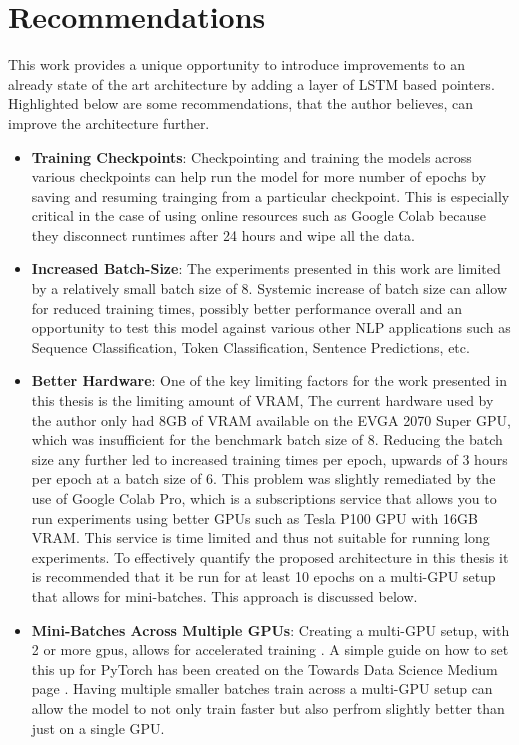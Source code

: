 \documentclass[a4paper,12pt]{report}
\begin{document}
    \section{Recommendations}
    
    This work provides a unique opportunity to introduce improvements to an already state of the art architecture by adding a layer of LSTM based pointers. Highlighted below are some recommendations, that the author believes, can improve the architecture further.
    
    \begin{itemize}
    	
    	\item \textbf{Training Checkpoints}: Checkpointing and training the models across various checkpoints can help run the model for more number of epochs by saving and resuming trainging from a particular checkpoint. This is especially critical in the case of using online resources such as Google Colab because they disconnect runtimes after 24 hours and wipe all the data. 
    	
    	\item \textbf{Increased Batch-Size}: The experiments presented in this work are limited by a relatively small batch size of 8. Systemic increase of batch size can allow for reduced training times, possibly better performance overall and an opportunity to test this model against various other NLP applications such as Sequence Classification, Token Classification, Sentence Predictions, etc. 
    	
    	\item \textbf{Better Hardware}: One of the key limiting factors for the work presented in this thesis is the limiting amount of VRAM, The current hardware used by the author only had 8GB of VRAM available on the EVGA 2070 Super GPU, which was insufficient for the benchmark batch size of 8. Reducing the batch size any further led to increased training times per epoch, upwards of 3 hours per epoch at a batch size of 6. This problem was slightly remediated by the use of Google Colab Pro, which is a subscriptions service that allows you to run experiments using better GPUs such as Tesla P100 GPU with 16GB VRAM. This service is time limited and thus not suitable for running long experiments. To effectively quantify the proposed architecture in this thesis it is recommended that it be run for at least 10 epochs on a multi-GPU setup that allows for mini-batches. This approach is discussed below.
    	
    	\item \textbf{Mini-Batches Across Multiple GPUs}: Creating a multi-GPU setup, with 2 or more gpus, allows for accelerated training \citep{multigpu1}. A simple guide on how to set this up for PyTorch has been created on the Towards Data Science Medium page \citep{multigpu2}. Having multiple smaller batches train across a multi-GPU setup can allow the model to not only train faster but also perfrom slightly better than just on a single GPU. 
    	

\end{itemize}
\end{document}
